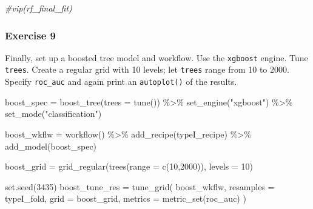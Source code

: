 \documentclass[
]{article}
\newenvironment{Shaded}{\begin{snugshade}}{\end{snugshade}}
\newcommand{\AttributeTok}[1]{\textcolor[rgb]{0.77,0.63,0.00}{#1}}
\newcommand{\CommentTok}[1]{\textcolor[rgb]{0.56,0.35,0.01}{\textit{#1}}}
\newcommand{\DecValTok}[1]{\textcolor[rgb]{0.00,0.00,0.81}{#1}}
\newcommand{\FunctionTok}[1]{\textcolor[rgb]{0.00,0.00,0.00}{#1}}
\newcommand{\NormalTok}[1]{#1}
\newcommand{\OtherTok}[1]{\textcolor[rgb]{0.56,0.35,0.01}{#1}}
\newcommand{\SpecialCharTok}[1]{\textcolor[rgb]{0.00,0.00,0.00}{#1}}
\newcommand{\StringTok}[1]{\textcolor[rgb]{0.31,0.60,0.02}{#1}}
\begin{document}
\begin{Shaded}
\begin{Highlighting}[]
\CommentTok{\#vip(rf\_final\_fit)}
\end{Highlighting}
\end{Shaded}

\hypertarget{exercise-9}{%
\subsubsection{Exercise 9}\label{exercise-9}}

Finally, set up a boosted tree model and workflow. Use the
\texttt{xgboost} engine. Tune \texttt{trees}. Create a regular grid with
10 levels; let \texttt{trees} range from 10 to 2000. Specify
\texttt{roc\_auc} and again print an \texttt{autoplot()} of the results.

\begin{Shaded}
\begin{Highlighting}[]
\NormalTok{boost\_spec }\OtherTok{=} \FunctionTok{boost\_tree}\NormalTok{(}\AttributeTok{trees =} \FunctionTok{tune}\NormalTok{()) }\SpecialCharTok{\%\textgreater{}\%}
  \FunctionTok{set\_engine}\NormalTok{(}\StringTok{"xgboost"}\NormalTok{) }\SpecialCharTok{\%\textgreater{}\%}
  \FunctionTok{set\_mode}\NormalTok{(}\StringTok{"classification"}\NormalTok{)}

\NormalTok{boost\_wkflw }\OtherTok{=} \FunctionTok{workflow}\NormalTok{() }\SpecialCharTok{\%\textgreater{}\%} 
  \FunctionTok{add\_recipe}\NormalTok{(typeI\_recipe) }\SpecialCharTok{\%\textgreater{}\%}
  \FunctionTok{add\_model}\NormalTok{(boost\_spec)}
\end{Highlighting}
\end{Shaded}

\begin{Shaded}
\begin{Highlighting}[]
\NormalTok{boost\_grid }\OtherTok{=} \FunctionTok{grid\_regular}\NormalTok{(}\FunctionTok{trees}\NormalTok{(}\AttributeTok{range =} \FunctionTok{c}\NormalTok{(}\DecValTok{10}\NormalTok{,}\DecValTok{2000}\NormalTok{)),}
                          \AttributeTok{levels =} \DecValTok{10}\NormalTok{)}
\end{Highlighting}
\end{Shaded}

\begin{Shaded}
\begin{Highlighting}[]
\FunctionTok{set.seed}\NormalTok{(}\DecValTok{3435}\NormalTok{)}
\NormalTok{boost\_tune\_res }\OtherTok{=} \FunctionTok{tune\_grid}\NormalTok{(}
\NormalTok{  boost\_wkflw,}
  \AttributeTok{resamples =}\NormalTok{ typeI\_fold, }
  \AttributeTok{grid =}\NormalTok{ boost\_grid,}
  \AttributeTok{metrics =} \FunctionTok{metric\_set}\NormalTok{(roc\_auc)}
\NormalTok{)}
\end{Highlighting}
\end{Shaded}
\end{document}
